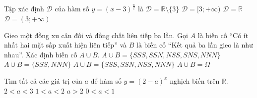 \begin{ex}%
	Tập xác định $\mathscr{D}$ của  hàm số $y=(x-3)^{\tfrac{\pi}{2}}$ là
	 \choice
		{$\mathscr{D}=\mathbb{R}  \setminus\{3\}$}
		{$\mathscr{D}=[3;+\infty)$} 
		{$\mathscr{D}=\mathbb{R}$} 
		{\True $\mathscr{D}=(3;+\infty)$} 
\end{ex}

\begin{ex}%
	Gieo một đồng xu cân đối và đồng chất liên tiếp ba lần. Gọi $A$  là biến cố ``Có ít nhất hai mặt sấp xuất hiện liên tiếp'' và $B$ là biến cố ``Kết quả ba lần gieo là như nhau''. Xác định biến cố $A \cup B$.
	 \choice
		{$A\cup B = \{SSS, SSN, NSS,SNS, NNN\}$} 
		{$A\cup B =  \{SSS, NNN\}$}
		 {\True $A\cup B = \{SSS, SSN, NSS, NNN\}$}
		 {$A\cup B = \Omega$}
\end{ex}

\begin{ex}%
	Tìm tất cả các giá trị của  $a$ để hàm số $ y = ( 2 - a)^x $ nghịch biến trên $ \mathbb{R} $.
	\choice 
		{$ 2 < a <  3 $}
		{\True $ 1  < a < 2 $}
		{$ a > 2  $}
		{$ 0 < a < 1 $} 
\end{ex}

